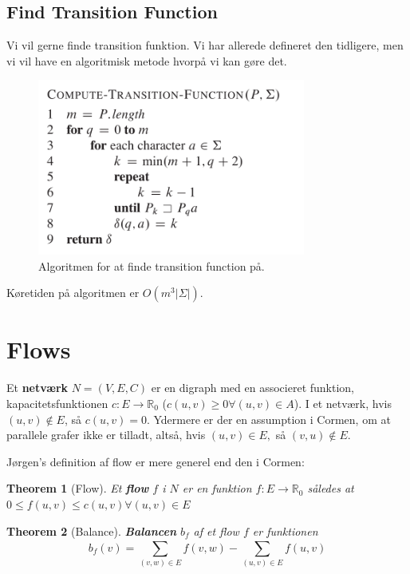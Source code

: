 \documentclass[11pt]{article}
\newtheorem{theorem}{Theorem}
\theoremstyle{definition}
\theoremstyle{remark}
\begin{document}
\subsection{Find Transition Function}

Vi vil gerne finde transition funktion. Vi har allerede defineret den tidligere, men vi vil have en algoritmisk metode hvorpå vi kan gøre det.


\begin{figure}[ht]
  \centering
\includegraphics[width=250pt]{compute-transition-function.png}
  \caption{\label{fig:compute-transition-function} Algoritmen for at finde transition function på.}
\end{figure}

Køretiden på algoritmen er $O(m^{3}|\Sigma|)$.


\newpage


\section{Flows}
\label{sec:flows}

Et \textbf{netværk} $N = (V,E,C)$ er en digraph med en associeret funktion, kapacitetsfunktionen $c : E \rightarrow \mathbb{R}_{0}$ ($c(u,v) \geq 0 \forall (u,v) \in A$). I et netværk, hvis $(u,v) \notin E$, så $c(u,v) = 0$.
Ydermere er der en assumption i Cormen, om at parallele grafer ikke er tilladt, altså, hvis $(u,v) \in E,$ så $(v,u) \notin E$.

Jørgen's definition af flow er mere generel end den i Cormen:

\begin{theorem}[Flow]
  Et \textbf{flow} $f$ i $N$ er en funktion $f : E \rightarrow \mathbb{R}_{0}$ således at $0 \leq f(u,v) \leq c(u,v) \forall (u,v) \in E$
\end{theorem}

\begin{theorem}[Balance]
  \textbf{Balancen}  $b_{f}$ af et flow $f$ er funktionen
  \[
    b_{f}(v) = \sum_{(v,w) \in E}^{} f(v,w) - \sum_{(u,v) \in E}^{} f(u,v)
  \]
\end{theorem}
\end{document}
